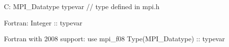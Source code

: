 C:
MPI_Datatype typevar // type defined in mpi.h

Fortran:
Integer :: typevar

Fortran with 2008 support:
use mpi_f08
Type(MPI_Datatype) :: typevar
